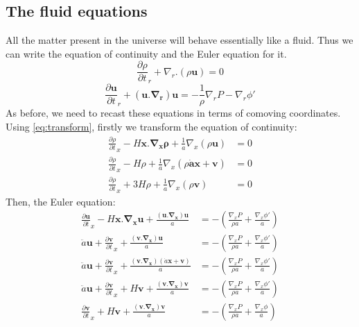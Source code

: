 \documentclass[12pt,a4paper,oneside]{book}
\def\pa{{\partial}}
\begin{document}
		\subsection{The fluid equations}
			All the matter present in the universe will behave essentially like a fluid. Thus we can write the equation of continuity and the Euler equation for it.
			\begin{equation}
				\frac{\partial \rho}{\partial t}_r+\nabla_r.(\rho\mathbf{u})=0
			\end{equation}
			\begin{equation}
				\frac{\partial\mathbf{u}}{\partial t}_r+\left(\mathbf{u.\nabla_r}\right)\mathbf{u}=-\frac{1}{\rho}\nabla_rP-\nabla_r\phi'
			\end{equation}
			As before, we need to recast these equations in terms of comoving coordinates. Using \ref{eq:transform}, firstly we transform the equation of continuity:
			\begin{equation}
				\begin{aligned}
					\frac{\partial\rho}{\partial t}_x -H\mathbf{x.\nabla_x\rho}+\frac{1}{a}\nabla_x(\rho\mathbf{u})&=0\\
					\frac{\partial\rho}{\partial t}_x -H\rho+\frac{1}{a}\nabla_x(\rho\mathbf{\dot{a}\mathbf{x}+\mathbf{v}})&=0\\
					\frac{\partial\rho}{\partial t}_x +3H\rho+\frac{1}{a}\nabla_x(\rho\mathbf{v})&=0
					\end{aligned}
					\label{eq:cont_x_nodelta}
			\end{equation}
			Then, the Euler equation:
			\begin{equation}
				\begin{aligned}
					\frac{\pa\mathbf{u}}{\partial t}_x -H\mathbf{x.\nabla_xu}+\frac{\mathbf{(u.\nabla_x)u}}{a}&=-\left(\frac{\nabla_xP}{\rho a}+\frac{\nabla_x\phi'}{a}\right)\\
					\ddot{a}\mathbf{u}+\frac{\pa \mathbf{v}}{\partial t}_x +\frac{\mathbf{(v.\nabla_x)u}}{a}&=-\left(\frac{\nabla_xP}{\rho a}+\frac{\nabla_x\phi'}{a}\right)\\
					\ddot{a}\mathbf{u}+\frac{\pa \mathbf{v}}{\partial t}_x +\frac{\mathbf{(v.\nabla_x)}(\dot{a}\mathbf{x+v})}{a}&=-\left(\frac{\nabla_xP}{\rho a}+\frac{\nabla_x\phi'}{a}\right)\\
					\ddot{a}\mathbf{u}+\frac{\pa \mathbf{v}}{\partial t}_x +H\mathbf{v}+\frac{\mathbf{(v.\nabla_x)}\mathbf{v}}{a}&=-\left(\frac{\nabla_xP}{\rho a}+\frac{\nabla_x\phi'}{a}\right)\\
					\frac{\pa \mathbf{v}}{\partial t}_x +H\mathbf{v}+\frac{\mathbf{(v.\nabla_x)}\mathbf{v}}{a}&=-\left(\frac{\nabla_xP}{\rho a}+\frac{\nabla_x\phi}{a}\right)\\
				\end{aligned}
				\label{eq:euler_x_nodelta}
			\end{equation}
\end{document}
